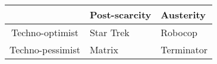 \doublespacing %
\begin{tabular}{c|l l} %
                 & Post-scarcity  & Austerity \\ \hline %
Techno-optimist  & Star Trek      & Robocop    \\ %
Techno-pessimist & Matrix         & Terminator \\
\end{tabular}

